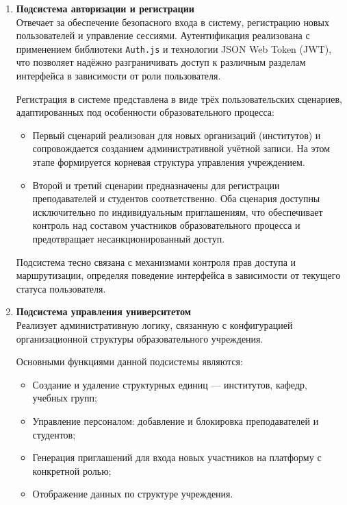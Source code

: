 \begin{enumerate}
  \item \textbf{Подсистема авторизации и регистрации}\\
  Отвечает за обеспечение безопасного входа в систему, регистрацию новых пользователей и управление сессиями. Аутентификация реализована с применением библиотеки \texttt{Auth.js} и технологии JSON Web Token (JWT), что позволяет надёжно разграничивать доступ к различным разделам интерфейса в зависимости от роли пользователя.  

  Регистрация в системе представлена в виде трёх пользовательских сценариев, адаптированных под особенности образовательного процесса:
  \begin{itemize}
    \item Первый сценарий реализован для новых организаций (институтов) и сопровождается созданием административной учётной записи. На этом этапе формируется корневая структура управления учреждением.
    \item Второй и третий сценарии предназначены для регистрации преподавателей и студентов соответственно. Оба сценария доступны исключительно по индивидуальным приглашениям, что обеспечивает контроль над составом участников образовательного процесса и предотвращает несанкционированный доступ.
  \end{itemize}
  
  Подсистема тесно связана с механизмами контроля прав доступа и маршрутизации, определяя поведение интерфейса в зависимости от текущего статуса пользователя.

  \item \textbf{Подсистема управления университетом}\\
  Реализует административную логику, связанную с конфигурацией организационной структуры образовательного учреждения.
  
  Основными функциями данной подсистемы являются:
  \begin{itemize}
    \item Создание и удаление структурных единиц — институтов, кафедр, учебных групп;
    \item Управление персоналом: добавление и блокировка преподавателей и студентов;
    \item Генерация приглашений для входа новых участников на платформу с конкретной ролью;
    \item Отображение данных по структуре учреждения.
  \end{itemize}
  

\end{enumerate}
